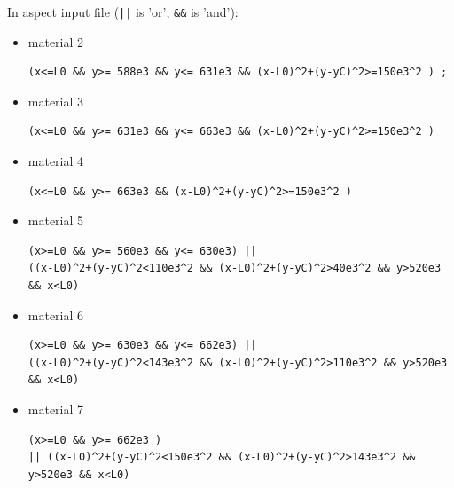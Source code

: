In aspect input file ({\tt ||} is 'or', {\tt \&\&}  is 'and'):
\begin{itemize}
\item material 2
\begin{verbatim}
(x<=L0 && y>= 588e3 && y<= 631e3 && (x-L0)^2+(y-yC)^2>=150e3^2 ) ; 
\end{verbatim}
\item material 3
\begin{verbatim}
(x<=L0 && y>= 631e3 && y<= 663e3 && (x-L0)^2+(y-yC)^2>=150e3^2 ) 
\end{verbatim}
\item material 4
\begin{verbatim}
(x<=L0 && y>= 663e3 && (x-L0)^2+(y-yC)^2>=150e3^2 )
\end{verbatim}
\item material 5
\begin{verbatim}
(x>=L0 && y>= 560e3 && y<= 630e3) || 
((x-L0)^2+(y-yC)^2<110e3^2 && (x-L0)^2+(y-yC)^2>40e3^2 && y>520e3 && x<L0) 
\end{verbatim}
\item material 6
\begin{verbatim}
(x>=L0 && y>= 630e3 && y<= 662e3) || 
((x-L0)^2+(y-yC)^2<143e3^2 && (x-L0)^2+(y-yC)^2>110e3^2 && y>520e3 && x<L0) 
\end{verbatim}
\item material 7
\begin{verbatim}
(x>=L0 && y>= 662e3 )  
|| ((x-L0)^2+(y-yC)^2<150e3^2 && (x-L0)^2+(y-yC)^2>143e3^2 && y>520e3 && x<L0) 
\end{verbatim}
\end{itemize}






